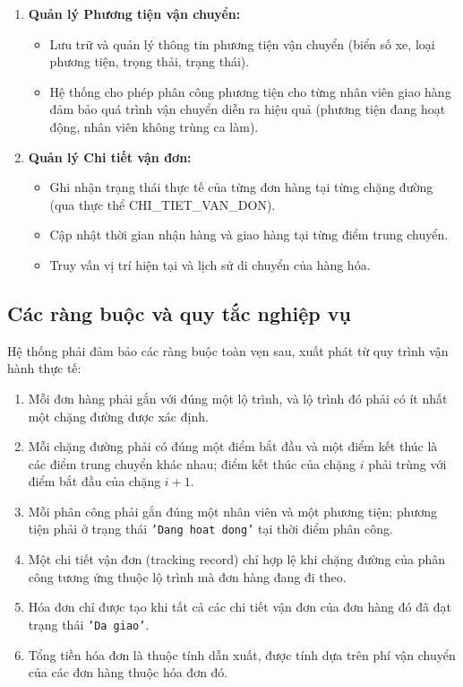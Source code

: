 \documentclass[11pt]{report}
\begin{document}
\begin{enumerate}
    \item \textbf{Quản lý Phương tiện vận chuyển:}
    \begin{itemize}
        \item Lưu trữ và quản lý thông tin phương tiện vận chuyển (biển số xe, loại phương tiện, trọng thải, trạng thái).
        
        \item Hệ thống cho phép phân công phương tiện cho từng nhân viên giao hàng đảm bảo quá trình vận chuyển diễn ra hiệu quả (phương tiện đang hoạt động, nhân viên không trùng ca làm).
    \end{itemize}
    
    \item \textbf{Quản lý Chi tiết vận đơn:}
    \begin{itemize}
        \item Ghi nhận trạng thái thực tế của từng đơn hàng tại từng chặng đường (qua thực thể CHI\_TIET\_VAN\_DON).
        
        \item Cập nhật thời gian nhận hàng và giao hàng tại từng điểm trung chuyển.
        
        \item Truy vấn vị trí hiện tại và lịch sử di chuyển của hàng hóa.
    \end{itemize}
\end{enumerate}

\subsection{Các ràng buộc và quy tắc nghiệp vụ}
Hệ thống phải đảm bảo các ràng buộc toàn vẹn sau, xuất phát từ quy trình vận hành thực tế:

\begin{enumerate}
    \item Mỗi đơn hàng phải gắn với đúng một lộ trình, và lộ trình đó phải có ít nhất một chặng đường được xác định.
    
    \item Mỗi chặng đường phải có đúng một điểm bắt đầu và một điểm kết thúc là các điểm trung chuyển khác nhau; điểm kết thúc của chặng $i$ phải trùng với điểm bắt đầu của chặng $i+1$.
    
    \item Mỗi phân công phải gắn đúng một nhân viên và một phương tiện; phương tiện phải ở trạng thái \texttt{'Dang hoat dong'} tại thời điểm phân công.
    
    \item Một chi tiết vận đơn (tracking record) chỉ hợp lệ khi chặng đường của phân công tương ứng thuộc lộ trình mà đơn hàng đang đi theo.
    
    \item Hóa đơn chỉ được tạo khi tất cả các chi tiết vận đơn của đơn hàng đó đã đạt trạng thái \texttt{'Da giao'}.
    
    \item Tổng tiền hóa đơn là thuộc tính dẫn xuất, được tính dựa trên phí vận chuyển của các đơn hàng thuộc hóa đơn đó.
\end{enumerate}
\end{document}
